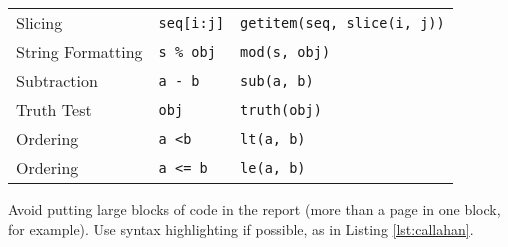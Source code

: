 \documentclass{l4proj}
\begin{document}
\begin{table}[]
\begin{tabular}{@{}lll@{}}
    Slicing               & \texttt{seq{[}i:j{]}}                   & \texttt{getitem(seq, slice(i, j))}                    \\
    String Formatting     & \texttt{s \% obj}                       & \texttt{mod(s, obj)}                                  \\
    Subtraction           & \texttt{a - b}                          & \texttt{sub(a, b)}                                    \\
    Truth Test            & \texttt{obj}                            & \texttt{truth(obj)}                                   \\
    Ordering              & \texttt{a \textless b}                  & \texttt{lt(a, b)}                                     \\
    Ordering              & \texttt{a \textless{}= b}               & \texttt{le(a, b)}                                     \\
    \end{tabular}
    \end{table}

Avoid putting large blocks of code in the report (more than a page in one block, for example). Use syntax highlighting if possible, as in Listing \ref{lst:callahan}.
\end{document}
